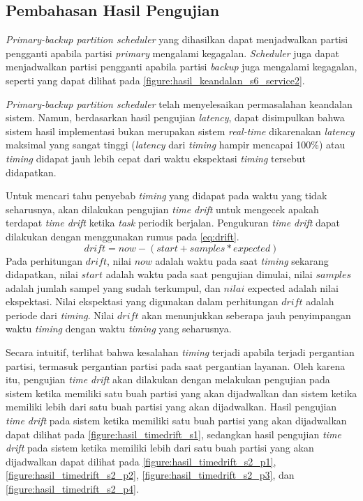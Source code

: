 \subsection{Pembahasan Hasil Pengujian}
\label{section:pembahasan_pengujian}

\textit{Primary-backup partition scheduler} yang dihasilkan dapat menjadwalkan partisi pengganti
apabila partisi \textit{primary} mengalami kegagalan. \textit{Scheduler} juga dapat menjadwalkan
partisi pengganti apabila partisi \textit{backup} juga mengalami kegagalan, seperti yang dapat
dilihat pada \autoref{figure:hasil_keandalan_s6_service2}.

\textit{Primary-backup partition scheduler} telah menyelesaikan permasalahan keandalan sistem.
Namun, berdasarkan hasil pengujian \textit{latency}, dapat disimpulkan bahwa sistem hasil
implementasi bukan merupakan sistem \textit{real-time} dikarenakan \textit{latency} maksimal
yang sangat tinggi (\textit{latency} dari \textit{timing} hampir mencapai 100\%) atau
\textit{timing} didapat jauh lebih cepat dari waktu ekspektasi \textit{timing} tersebut
didapatkan.

Untuk mencari tahu penyebab \textit{timing} yang didapat pada waktu yang tidak seharusnya, akan
dilakukan pengujian \textit{time drift} untuk mengecek apakah terdapat \textit{time drift}
ketika \textit{task} periodik berjalan. Pengukuran \textit{time drift} dapat dilakukan dengan
menggunakan rumus pada \autoref{eq:drift}.
\begin{equation}\label{eq:drift}
	drift = now - (start + samples * expected)
\end{equation}
Pada perhitungan $drift$, nilai $now$ adalah waktu pada saat \textit{timing} sekarang
didapatkan, nilai $start$ adalah waktu pada saat pengujian dimulai, nilai $samples$ adalah
jumlah sampel yang sudah terkumpul, dan $nilai$ expected adalah nilai ekspektasi. Nilai
ekspektasi yang digunakan dalam perhitungan $drift$ adalah periode dari \textit{timing}. Nilai
$drift$ akan menunjukkan seberapa jauh penyimpangan waktu \textit{timing} dengan waktu
\textit{timing} yang seharusnya.

Secara intuitif, terlihat bahwa kesalahan \textit{timing} terjadi apabila terjadi pergantian
partisi, termasuk pergantian partisi pada saat pergantian layanan. Oleh karena itu, pengujian
\textit{time drift} akan dilakukan dengan melakukan pengujian pada sistem ketika memiliki satu
buah partisi yang akan dijadwalkan dan sistem ketika memiliki lebih dari satu buah partisi yang
akan dijadwalkan. Hasil pengujian \textit{time drift} pada sistem ketika memiliki satu buah
partisi yang akan dijadwalkan dapat dilihat pada \autoref{figure:hasil_timedrift_s1}, sedangkan
hasil pengujian \textit{time drift} pada sistem ketika memiliki lebih dari satu buah partisi
yang akan dijadwalkan dapat dilihat pada \autoref{figure:hasil_timedrift_s2_p1},
\autoref{figure:hasil_timedrift_s2_p2}, \autoref{figure:hasil_timedrift_s2_p3}, dan
\autoref{figure:hasil_timedrift_s2_p4}. 

